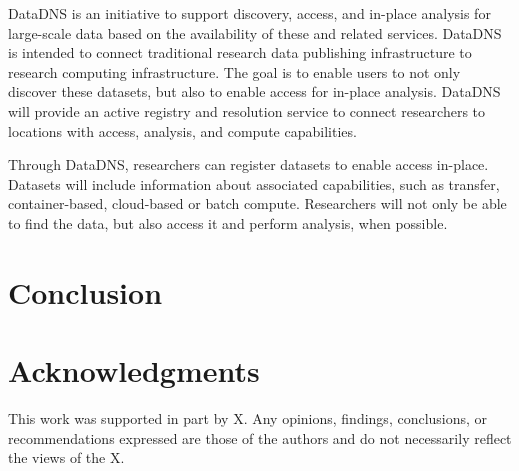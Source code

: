 \documentclass{sig-alternate}
\begin{document}
DataDNS is an initiative to support discovery, access, and in-place analysis for large-scale data based on the availability of these and related services. DataDNS is intended to connect traditional research data publishing infrastructure to research computing infrastructure. The goal is to enable users to not only discover these datasets, but also to enable access for in-place analysis. DataDNS will provide an active registry and resolution service to connect researchers to locations with access, analysis, and compute capabilities.  

Through DataDNS, researchers can register datasets to enable access in-place. Datasets will include information about associated capabilities, such as transfer, container-based, cloud-based or batch compute. Researchers will not only be able to find the data, but also access it and perform analysis, when possible.   


\section{Conclusion}




\section{Acknowledgments}
This work was supported in part by X. Any opinions, findings, conclusions, or recommendations expressed are those of the authors and do not necessarily reflect the views of the X.


  
\end{document}
